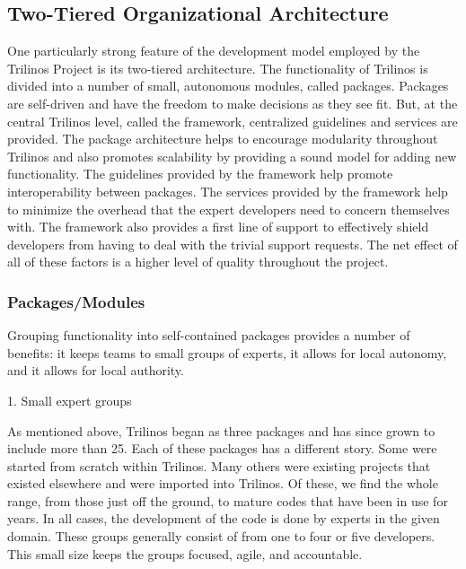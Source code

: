 \documentclass[12pt,relax]{article}
\begin{document}
\subsection{Two-Tiered Organizational Architecture}

One particularly strong feature of the development model employed by the
Trilinos Project is its two-tiered architecture.  The functionality of Trilinos
is divided into a number of small, autonomous modules, called packages. 
Packages are self-driven and have the freedom to make decisions as they see
fit.  But, at the central Trilinos level, called the framework, centralized
guidelines and services are provided.  The package architecture helps to
encourage modularity throughout Trilinos and also promotes scalability by
providing a sound model for adding new functionality.  The guidelines provided
by the framework help promote interoperability between packages.  The services
provided by the framework help to minimize the overhead that the expert
developers need to concern themselves with.  The framework also provides a
first line of support to effectively shield developers from having to deal
with the trivial support requests.  The net effect of all of these factors is
a higher level of quality throughout the project.

  \subsubsection{Packages/Modules}
  
  Grouping functionality into self-contained packages provides a number of
  benefits:  it keeps teams to small groups of experts, it allows for local
  autonomy, and it allows for local authority.
  
  1. Small expert groups
  
  As mentioned above, Trilinos began as three packages and has since grown to 
  include more than 25.  Each of these packages has a different story.  Some
  were started from scratch within Trilinos.  Many others were existing
  projects that existed elsewhere and were imported into Trilinos.  Of these,
  we find the whole range, from those just off the ground, to mature codes
  that have been in use for years.  In all cases, the development of the 
  code is done by experts in the given domain.  These groups generally consist
  of from one to four or five developers.  This small size keeps the groups
  focused, agile, and accountable.
  
\end{document}
